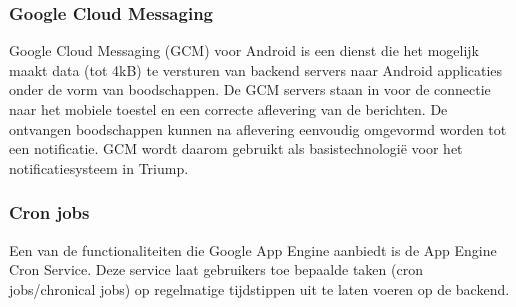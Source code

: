 \subsubsection{Google Cloud Messaging~\cite{Google_Cloud_Messaging}}

Google Cloud Messaging (GCM) voor Android is een dienst die het mogelijk maakt data (tot 4kB) te versturen van backend servers naar Android applicaties onder de vorm van boodschappen. De GCM servers staan in voor de connectie naar het mobiele toestel en een correcte aflevering van de berichten. De ontvangen boodschappen kunnen na aflevering eenvoudig omgevormd worden tot een notificatie. GCM wordt daarom gebruikt als basistechnologië voor het notificatiesysteem in Triump.

\subsubsection{Cron jobs~\cite{Google_Cron_Jobs}}

Een van de functionaliteiten die Google App Engine aanbiedt is de App Engine Cron Service. Deze service laat gebruikers toe bepaalde taken (cron jobs/chronical jobs) op regelmatige tijdstippen uit te laten voeren op de backend.


